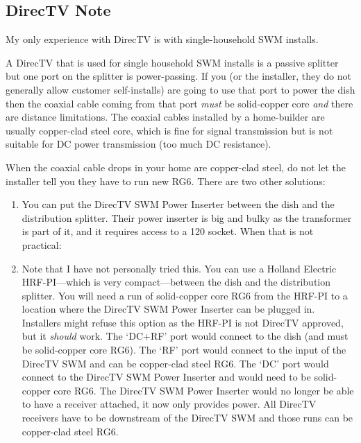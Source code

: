 \subsection{DirecTV Note}

My only experience with DirecTV is with single-household SWM installs.

A DirecTV  that is used for single household SWM installs is a passive
splitter but one port on the splitter is power-passing. If you (or the installer, they do not generally
allow customer self-installs) are going to use that port to power the dish then the coaxial cable coming
from that port \emph{must} be solid-copper core \emph{and} there are distance limitations. The coaxial
cables installed by a home-builder are usually copper-clad steel core, which is fine for signal transmission
but is not suitable for DC power transmission (too much DC resistance).

When the coaxial cable drops in your home are copper-clad steel, do not let the installer tell you they
have to run new RG6. There are two other solutions:

\begin{enumerate}
  \item You can put the DirecTV SWM Power Inserter between the dish and the distribution splitter. Their
        power inserter is big and bulky as the transformer is part of it, and it requires access to a
        \SI{120}{\vrms} socket. When that is not practical:
  \item Note that I have not personally tried this. You can use a Holland Electric HRF-PI---which is
        very compact---between the dish and the distribution splitter. You will need a run of
        solid-copper core RG6 from the HRF-PI to a location where the DirecTV SWM Power Inserter can
        be plugged in. Installers might refuse this option as the HRF-PI is not DirecTV approved, but
        it \emph{should} work. The `DC+RF' port would connect to the dish (and must be solid-copper core
        RG6). The `RF' port would connect to the input of the DirecTV SWM 
        and can be copper-clad steel RG6. The `DC' port would connect to the DirecTV SWM Power Inserter
        and would need to be solid-copper core RG6. The DirecTV SWM Power Inserter would no longer be
        able to have a receiver attached, it now only provides power. All DirecTV receivers have to be
        downstream of the DirecTV SWM  and those runs can be copper-clad
        steel RG6.
\end{enumerate}

